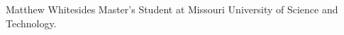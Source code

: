 \documentclass[journal,onecolumn]{IEEEtran}
\begin{document}
\ifCLASSOPTIONcaptionsoff
  \newpage
\fi




\begin{IEEEbiographynophoto}{Matthew Whitesides}
  Master's Student at Missouri University of Science and Technology.
\end{IEEEbiographynophoto}

\end{document}
